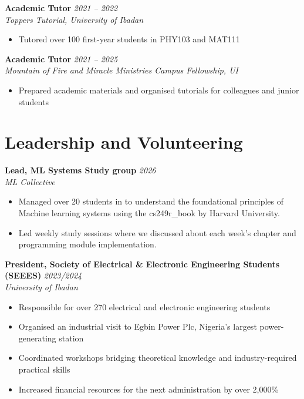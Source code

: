 \documentclass[10pt, a4paper]{article}
\newcommand{\cventry}[4]{%
  \noindent\textbf{#1} \hfill \textit{#2}\\%
  \textit{#3} \hfill \small{#4}\\[-4pt]%
}
\begin{document}
\vspace{4pt}
\cventry{Academic Tutor}{2021 -- 2022}{Toppers Tutorial, University of Ibadan}{}
\begin{itemize}
  \item Tutored over 100 first-year students in PHY103 and MAT111
\end{itemize}

\vspace{4pt}
\cventry{Academic Tutor}{2021 -- 2025}{Mountain of Fire and Miracle Ministries Campus Fellowship, UI}{}
\begin{itemize}
  \item Prepared academic materials and organised tutorials for colleagues and junior students
\end{itemize}

\section{Leadership and Volunteering}
\cventry{Lead, ML Systems Study group}{2026}{ML Collective}{}
\begin{itemize}
  \item Managed over 20 students in to understand the foundational principles of Machine learning systems using the cs249r\_book by Harvard University.

  \item Led weekly study sessions where we discussed about each week's chapter and programming module implementation.
\end{itemize}
\cventry{President, Society of Electrical \& Electronic Engineering Students (SEEES)}{2023/2024}{University of Ibadan}{}
\begin{itemize}
  \item Responsible for over 270 electrical and electronic engineering students
  \item Organised an industrial visit to Egbin Power Plc, Nigeria's largest power-generating station
  \item Coordinated workshops bridging theoretical knowledge and industry-required practical skills
  \item Increased financial resources for the next administration by over 2{,}000\%
\end{itemize}
\end{document}

